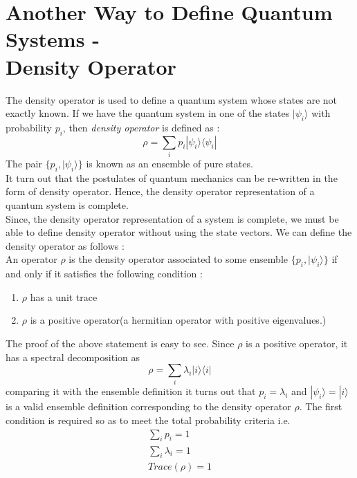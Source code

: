 
\section{Another Way to Define Quantum Systems - \\ Density Operator}
The density operator is used to define a quantum system whose states are not exactly known. If we have the quantum system in one of the states $|\psi_i \rangle$ with probability $p_i$, then {\it density operator} is defined as :
\begin{equation}
\rho = \sum_i p_i |\psi_i \rangle \langle \psi_i |
\end{equation}
The pair $\{ p_i, |\psi_i \rangle\}$ is known as an ensemble of pure states.\\
It turn out that the postulates of quantum mechanics can be re-written in the form of density operator. Hence, the density operator representation of a quantum system is complete. \\
Since, the density operator representation of a system is complete, we must be able to define density operator without using the state vectors. We can define the density operator as follows :\\ 
An operator $\rho$ is the density operator associated to some ensemble  $\{ p_i, |\psi_i \rangle\}$ if and only if it satisfies the following condition : 
\begin{enumerate}
\item $\rho$ has a unit trace
\item $\rho$ is a positive operator(a hermitian operator with positive eigenvalues.)
\end{enumerate}
The proof of the above statement is easy to see. Since $\rho$ is a positive operator, it has a spectral decomposition as 
\begin{equation}
\rho = \sum_i \lambda_i |i\rangle \langle i|
\end{equation}
comparing it with the ensemble definition it turns out that $p_i = \lambda_i$ and $|\psi_i\rangle = |i\rangle $ is a valid ensemble definition corresponding to the density operator $\rho$. The first condition is required so as to meet the total probability criteria i.e. 
\begin{equation}
\begin{split}
\sum_i p_i =1 \\
\sum_i \lambda_i = 1\\
Trace(\rho ) =1
\end{split}
\end{equation}
